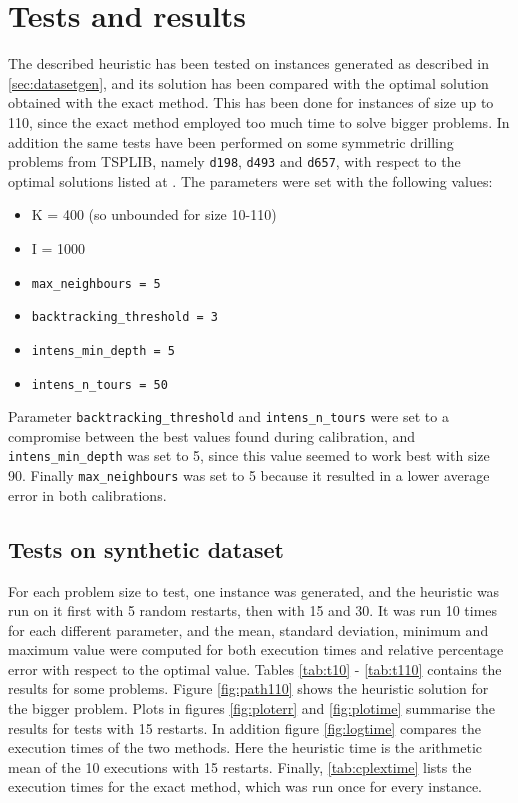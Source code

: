 
\section{Tests and results}
\label{sec:results}
The described heuristic has been tested on instances generated as described in \cref{sec:datasetgen}, and its solution has been compared with the optimal solution obtained with the exact method. This has been done for instances of size up to 110, since the exact method employed too much time to solve bigger problems. In addition the same tests have been performed on some symmetric drilling problems from TSPLIB, namely \texttt{d198}, \texttt{d493} and \texttt{d657}, with respect to the optimal solutions listed at \cite{Tsplibsol}.
The parameters were set with the following values:
\begin{itemize}
	\setlength\itemsep{0.03em}
	\item K = 400 (so unbounded for size 10-110)
	\item I = 1000
	\item \texttt{max\_neighbours = 5}
	\item \texttt{backtracking\_threshold = 3}
	\item \texttt{intens\_min\_depth = 5}
	\item \texttt{intens\_n\_tours = 50}
\end{itemize}
Parameter \texttt{backtracking\_threshold} and \texttt{intens\_n\_tours} were set to a compromise between the best values found during calibration, and \texttt{intens\_min\_depth} was set to 5, since this value seemed to work best with size 90. Finally \texttt{max\_neighbours} was set to 5 because it resulted in a lower average error in both calibrations.

\subsection{Tests on synthetic dataset}
For each problem size to test, one instance was generated, and the heuristic was run on it first with 5 random restarts, then with 15 and 30. It was run 10 times for each different parameter, and the mean, standard deviation, minimum and maximum value were computed for both execution times and relative percentage error with respect to the optimal value. Tables \ref{tab:t10} - \ref{tab:t110} contains the results for some problems. Figure \ref{fig:path110} shows the heuristic solution for the bigger problem. Plots in figures \ref{fig:ploterr} and \ref{fig:plotime} summarise the results for tests with 15 restarts. In addition figure \ref{fig:logtime} compares the execution times of the two methods. Here the heuristic time is the arithmetic mean of the 10 executions with 15 restarts. Finally, \cref{tab:cplextime} lists the execution times for the exact method, which was run once for every instance.

